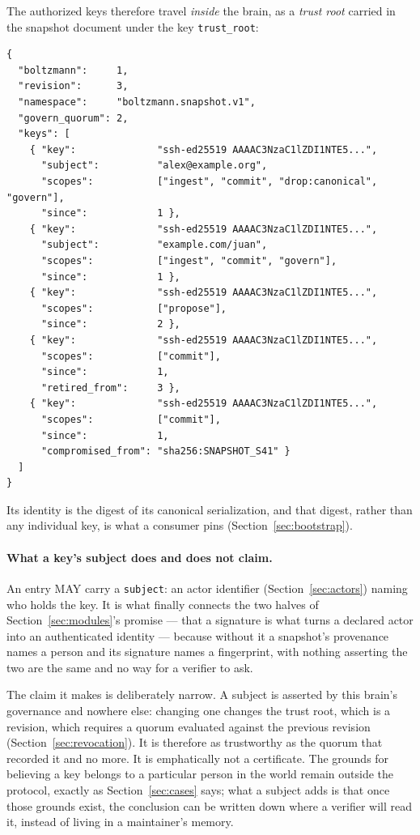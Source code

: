 \documentclass[11pt,a4paper]{article}
\begin{document}
The authorized keys therefore travel \emph{inside} the brain, as a \emph{trust
root} carried in the snapshot document under the key \texttt{trust\_root}:
\begin{verbatim}
{
  "boltzmann":     1,
  "revision":      3,
  "namespace":     "boltzmann.snapshot.v1",
  "govern_quorum": 2,
  "keys": [
    { "key":              "ssh-ed25519 AAAAC3NzaC1lZDI1NTE5...",
      "subject":          "alex@example.org",
      "scopes":           ["ingest", "commit", "drop:canonical", "govern"],
      "since":            1 },
    { "key":              "ssh-ed25519 AAAAC3NzaC1lZDI1NTE5...",
      "subject":          "example.com/juan",
      "scopes":           ["ingest", "commit", "govern"],
      "since":            1 },
    { "key":              "ssh-ed25519 AAAAC3NzaC1lZDI1NTE5...",
      "scopes":           ["propose"],
      "since":            2 },
    { "key":              "ssh-ed25519 AAAAC3NzaC1lZDI1NTE5...",
      "scopes":           ["commit"],
      "since":            1,
      "retired_from":     3 },
    { "key":              "ssh-ed25519 AAAAC3NzaC1lZDI1NTE5...",
      "scopes":           ["commit"],
      "since":            1,
      "compromised_from": "sha256:SNAPSHOT_S41" }
  ]
}
\end{verbatim}
Its identity is the digest of its canonical serialization, and that digest,
rather than any individual key, is what a consumer pins
(Section~\ref{sec:bootstrap}).

\paragraph{What a key's subject does and does not claim.}
An entry MAY carry a \texttt{subject}: an actor identifier
(Section~\ref{sec:actors}) naming who holds the key. It is what finally connects
the two halves of Section~\ref{sec:modules}'s promise --- that a signature is
what turns a declared actor into an authenticated identity --- because without
it a snapshot's provenance names a person and its signature names a fingerprint,
with nothing asserting the two are the same and no way for a verifier to ask.

The claim it makes is deliberately narrow. A subject is asserted by this brain's
governance and nowhere else: changing one changes the trust root, which is a
revision, which requires a quorum evaluated against the previous revision
(Section~\ref{sec:revocation}). It is therefore as trustworthy as the quorum
that recorded it and no more. It is emphatically not a certificate. The grounds
for believing a key belongs to a particular person in the world remain outside
the protocol, exactly as Section~\ref{sec:cases} says; what a subject adds is
that once those grounds exist, the conclusion can be written down where a
verifier will read it, instead of living in a maintainer's memory.
\end{document}
